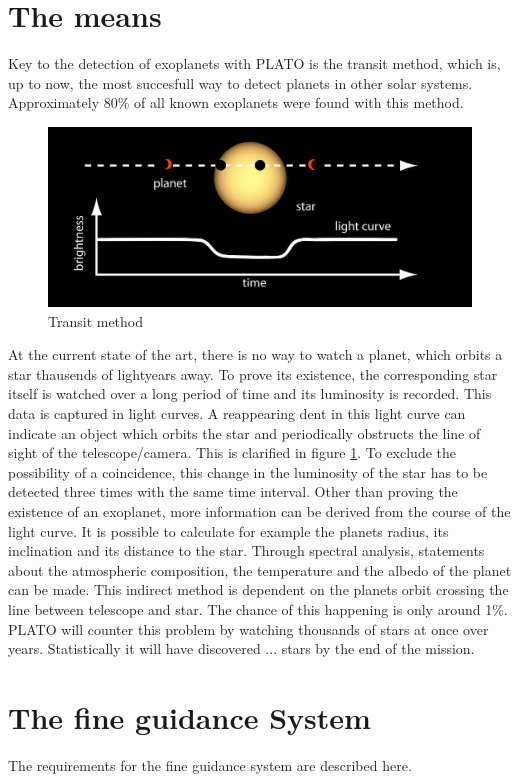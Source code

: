 \section{The means}
Key to the detection of exoplanets with PLATO is the transit method, which is, up to now, the most succesfull way to detect planets in other solar systems. Approximately 80\% of all known exoplanets were found with this method.
\newline

\begin{figure}[h]
	\centering
	\includegraphics[width=\textwidth]{Transit_Methode.jpg}
	\caption{Transit method}
	\label{fig:mesh2}
\end{figure}


At the current state of the art, there is no way to watch a planet, which orbits a star thausends of lightyears away. To prove its existence, the corresponding star itself is watched over a long period of time and its luminosity is recorded. This data is captured in light curves. A reappearing dent in this light curve can indicate an object which orbits the star and periodically obstructs the line of sight of the telescope/camera. This is clarified in figure \ref{fig:mesh2}. To exclude the possibility of a coincidence, this change in the luminosity of the star has to be detected three times with the same time interval. Other than proving the existence of an exoplanet, more information can be derived from the course of the light curve. It is possible to calculate for example the planets radius, its inclination and its distance to the star. Through spectral analysis, statements about the atmospheric composition, the temperature and the albedo of the planet can be made.           
\newline 
This indirect method is dependent on the planets orbit crossing the line between telescope and star. The chance of this happening is only around 1\%. PLATO will counter this problem by watching thousands of stars at once over years. Statistically it will have discovered ... stars by the end of the mission.  
 
\section{The fine guidance System}
The requirements for the fine guidance system are described here.